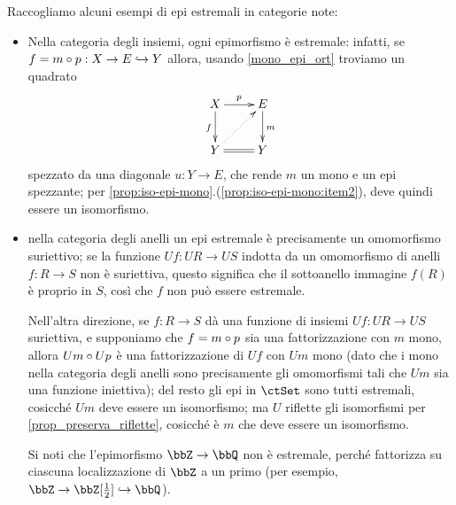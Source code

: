 \begin{remark}
	Raccogliamo alcuni esempi di epi estremali in categorie note:
	\begin{itemize}
		\item Nella categoria degli insiemi, ogni epimorfismo è estremale: infatti, se \(f = m\circ p : X \to E \hookrightarrow Y\) allora, usando \ref{mono_epi_ort} troviamo un quadrato
		      \[\xymatrix{
				      X \ar[r]^p\ar[d]_f & E\ar[d]^m \\
				      Y \ar@{=}[r]\ar@{.>}[ur] & Y
			      }\]
		      spezzato da una diagonale \(u : Y \to E\), che rende \(m\) un mono e un epi spezzante; per \ref{prop:iso-epi-mono}.(\ref{prop:iso-epi-mono:item2}), deve quindi essere un isomorfismo.
		\item nella categoria degli anelli un epi estremale è precisamente un omomorfismo suriettivo; se la funzione \(Uf : UR\to US\) indotta da un omomorfismo di anelli \(f : R\to S\) non è suriettiva, questo significa che il sottoanello immagine \(f(R)\) è proprio in \(S\), così che \(f\) non può essere estremale.

		      Nell'altra direzione, se \(f : R\to S\) dà una funzione di insiemi \(Uf : UR\to US\) suriettiva, e supponiamo che \(f = m\circ p\) sia una fattorizzazione con \(m\) mono, allora \(Um\circ Up\) è una fattorizzazione di \(Uf\) con \(Um\) mono (dato che i mono nella categoria degli anelli sono precisamente gli omomorfismi tali che \(Um\) sia una funzione iniettiva); del resto gli epi in \(\ctSet\) sono tutti estremali, cosicché \(Um\) deve essere un isomorfismo; ma \(U\) riflette gli isomorfismi per \ref{prop_preserva_riflette}, cosicché è \(m\) che deve essere un isomorfismo.

		      Si noti che l'epimorfismo \(\bbZ\to\bbQ\) non è estremale, perché fattorizza su ciascuna localizzazione di \(\bbZ\) a un primo (per esempio, \(\bbZ \to \bbZ[\frac 12]\mono \bbQ\)).
	\end{itemize}
\end{remark}
